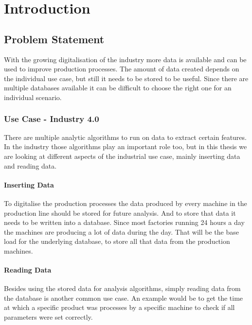 \chapter{Introduction}
\label{ch:Introduction}

\section{Problem Statement}
With the growing digitalisation of the industry more data is available and can be used to improve production processes.
The amount of data created depends on the individual use case,
but still it needs to be stored to be useful.
Since there are multiple databases available it can be difficult to choose the right one for an individual scenario.

\subsection{Use Case - Industry 4.0}
There are multiple analytic algorithms to run on data to extract certain features.
In the industry those algorithms play an important role too,
but in this thesis we are looking at different aspects of the industrial use case,
mainly inserting data and reading data.

\subsubsection{Inserting Data}
\newline
To digitalise the production processes the data produced by every machine in the production line should be stored for future analysis.
And to store that data it needs to be written into a database.
Since most factories running 24 hours a day the machines are producing a lot of data during the day.
That will be the base load for the underlying database, to store all that data from the production machines.

\subsubsection{Reading Data}
\newline
Besides using the stored data for analysis algorithms,
simply reading data from the database is another common use case.
An example would be to get the time at which a specific product was processes by a specific machine to check if all parameters were set correctly.

